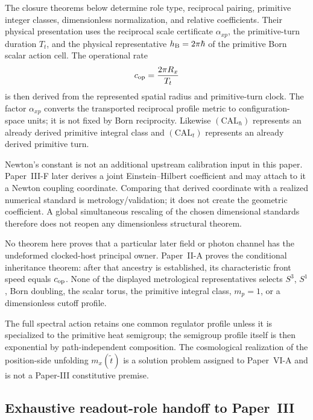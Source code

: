 \documentclass[12pt,a4paper]{article}
\begin{document}
\begin{remark}
\label{p3:rem:dimensionful-calibration-boundary}
The closure theorems below determine role type, reciprocal pairing,
primitive integer classes, dimensionless normalization, and relative
coefficients.  Their physical presentation uses the reciprocal scale
certificate \(\alpha_{xp}\), the primitive-turn duration \(T_t\), and the
physical representative \(h_{\mathrm B}=2\pi\hbar\) of the primitive Born scalar
action cell.  The operational rate
\[
 c_{\rm op}=\frac{2\pi R_x}{T_t}
\]
is then derived from the represented spatial radius and primitive-turn clock.
The factor \(\alpha_{xp}\) converts the transported reciprocal profile metric
to configuration-space units; it is not fixed by Born reciprocity.  Likewise
\((\mathrm{CAL}_{\hbar})\) represents an already derived primitive integral
class and \((\mathrm{CAL}_t)\) represents an already derived primitive turn.

Newton's constant is not an additional upstream calibration input in this
paper.  Paper~III-F later derives a joint Einstein--Hilbert coefficient and
may attach to it a Newton coupling coordinate.  Comparing that derived
coordinate with a realized numerical standard is metrology/validation; it does
not create the geometric coefficient.  A global simultaneous rescaling of the
chosen dimensional standards therefore does not reopen any dimensionless
structural theorem.

No theorem here proves that a particular later field or photon channel has the
undeformed clocked-host principal owner.  Paper~II-A proves the conditional
inheritance theorem: after that ancestry is established, its characteristic
front speed equals \(c_{\rm op}\).  None of the displayed metrological
representatives selects \(S^3\), \(S^1\), Born doubling, the scalar torus,
the primitive integral class, \(m_p=1\), or a dimensionless cutoff profile.

The full spectral action retains one common regulator profile unless it is
specialized to the primitive heat semigroup; the semigroup profile itself is
then exponential by path-independent composition.  The cosmological
realization of the position-side unfolding \(m_x(\widetilde t)\) is a solution
problem assigned to Paper~VI-A and is not a Paper-III constitutive premise.
\end{remark}

\subsection{Exhaustive readout-role handoff to Paper~III}
\label{p3a:sec:readout-role-handoff}
\end{document}
